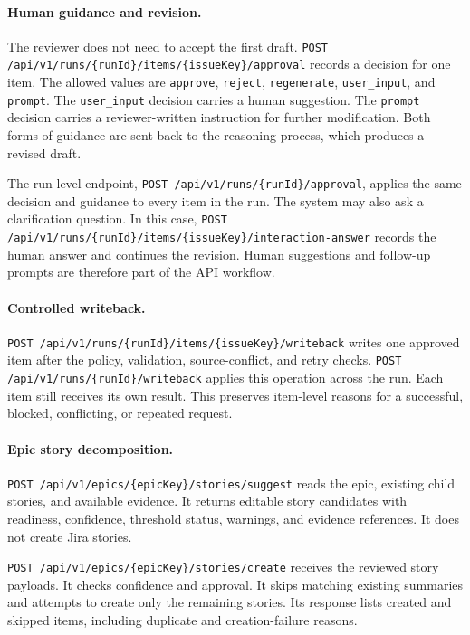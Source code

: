 \documentclass[pdflatex,sn-basic]{sn-jnl}
\begin{document}
\paragraph{Human guidance and revision.}
The reviewer does not need to accept the first draft. \texttt{POST /api/v1/runs/\allowbreak\{runId\}/\allowbreak{}items/\allowbreak\{issueKey\}/\allowbreak{}approval} records a decision for one item. The allowed values are \texttt{approve}, \texttt{reject}, \texttt{regenerate}, \texttt{user\_input}, and \texttt{prompt}. The \texttt{user\_input} decision carries a human suggestion. The \texttt{prompt} decision carries a reviewer-written instruction for further modification. Both forms of guidance are sent back to the reasoning process, which produces a revised draft.

The run-level endpoint, \texttt{POST /api/v1/runs/\allowbreak\{runId\}/\allowbreak{}approval}, applies the same decision and guidance to every item in the run. The system may also ask a clarification question. In this case, \texttt{POST /api/v1/runs/\allowbreak\{runId\}/\allowbreak{}items/\allowbreak\{issueKey\}/\allowbreak{}interaction-answer} records the human answer and continues the revision. Human suggestions and follow-up prompts are therefore part of the API workflow.

\paragraph{Controlled writeback.}
\texttt{POST /api/v1/runs/\allowbreak\{runId\}/\allowbreak{}items/\allowbreak\{issueKey\}/\allowbreak{}writeback} writes one approved item after the policy, validation, source-conflict, and retry checks. \texttt{POST /api/v1/runs/\allowbreak\{runId\}/\allowbreak{}writeback} applies this operation across the run. Each item still receives its own result. This preserves item-level reasons for a successful, blocked, conflicting, or repeated request.

\paragraph{Epic story decomposition.}
\texttt{POST /api/v1/epics/\allowbreak\{epicKey\}/\allowbreak{}stories/\allowbreak{}suggest} reads the epic, existing child stories, and available evidence. It returns editable story candidates with readiness, confidence, threshold status, warnings, and evidence references. It does not create Jira stories.

\texttt{POST /api/v1/epics/\allowbreak\{epicKey\}/\allowbreak{}stories/\allowbreak{}create} receives the reviewed story payloads. It checks confidence and approval. It skips matching existing summaries and attempts to create only the remaining stories. Its response lists created and skipped items, including duplicate and creation-failure reasons.
\end{document}
